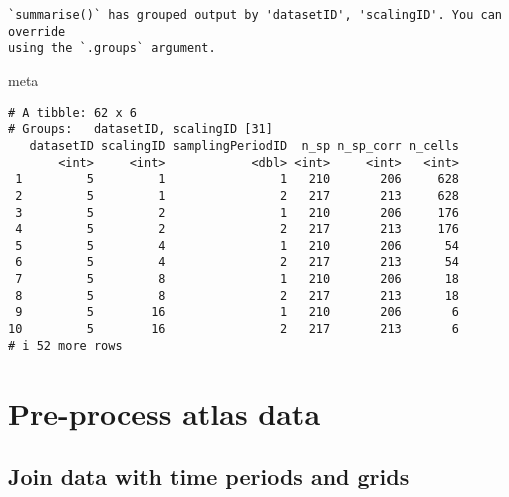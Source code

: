\documentclass[
  letterpaper,
  DIV=11,
  numbers=noendperiod]{scrreprt}
\newenvironment{Shaded}{\begin{snugshade}}{\end{snugshade}}
\newcommand{\FunctionTok}[1]{\textcolor[rgb]{0.28,0.35,0.67}{#1}}
\newcommand{\NormalTok}[1]{\textcolor[rgb]{0.00,0.23,0.31}{#1}}
\newcommand{\SpecialCharTok}[1]{\textcolor[rgb]{0.37,0.37,0.37}{#1}}
\newcommand{\StringTok}[1]{\textcolor[rgb]{0.13,0.47,0.30}{#1}}
\begin{document}
\begin{verbatim}
`summarise()` has grouped output by 'datasetID', 'scalingID'. You can override
using the `.groups` argument.
\end{verbatim}

\begin{Shaded}
\begin{Highlighting}[]
\NormalTok{meta}
\end{Highlighting}
\end{Shaded}

\begin{verbatim}
# A tibble: 62 x 6
# Groups:   datasetID, scalingID [31]
   datasetID scalingID samplingPeriodID  n_sp n_sp_corr n_cells
       <int>     <int>            <dbl> <int>     <int>   <int>
 1         5         1                1   210       206     628
 2         5         1                2   217       213     628
 3         5         2                1   210       206     176
 4         5         2                2   217       213     176
 5         5         4                1   210       206      54
 6         5         4                2   217       213      54
 7         5         8                1   210       206      18
 8         5         8                2   217       213      18
 9         5        16                1   210       206       6
10         5        16                2   217       213       6
# i 52 more rows
\end{verbatim}

\begin{Shaded}
\end{Shaded}

\hypertarget{pre-process-atlas-data}{%
\section{Pre-process atlas data}\label{pre-process-atlas-data}}

\hypertarget{join-data-with-time-periods-and-grids}{%
\subsection{Join data with time periods and
grids}\label{join-data-with-time-periods-and-grids}}
\end{document}
